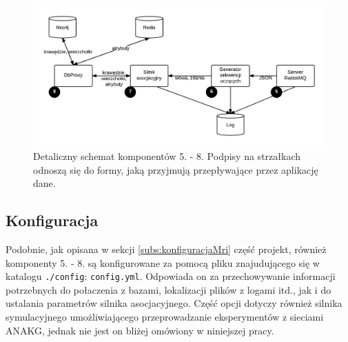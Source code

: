 \begin{figure}[!h]
    \centering
    \label{graph:neo4j}
    \includegraphics[scale=0.22]{neo4j}
    \caption{Detaliczny schemat komponentów 5. - 8. Podpisy na strzałkach odnoszą się do formy, jaką przyjmują przepływające przez aplikację dane.}
\end{figure}

\subsection{Konfiguracja}
\label{subs:konfiguracjaNeo4j}

Podobnie, jak opisana w sekcji \ref{subs:konfiguracjaMri} część projekt, również komponenty 5. - 8. są konfigurowane za pomocą pliku znajudującego się w katalogu 
\texttt{./config}: \texttt{config.yml}. Odpowiada on za przechowywanie informacji potrzebnych do połaczenia z bazami, lokalizacji plików z logami itd., jak i do 
ustalania parametrów silnika asocjacyjnego. Część opcji dotyczy również silnika symulacyjnego umożliwiającego przeprowadzanie eksperymentów z sieciami ANAKG, jednak
nie jest on bliżej omówiony w niniejszej pracy.

